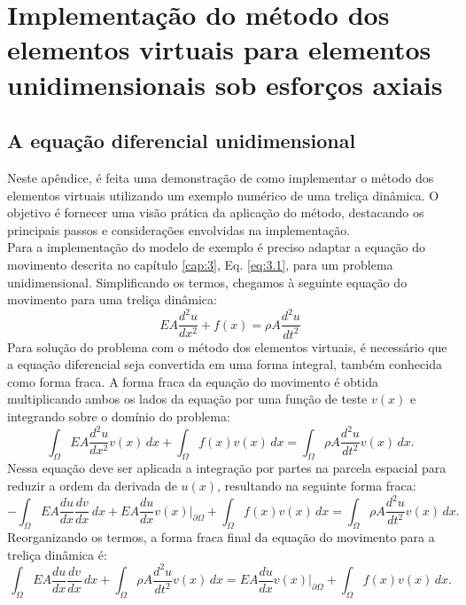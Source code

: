 \chapter{Implementação do método dos elementos virtuais para elementos unidimensionais sob esforços axiais}

\section{A equação diferencial unidimensional}

\indent Neste apêndice, é feita uma demonstração de como implementar o método dos elementos virtuais utilizando um exemplo numérico de uma treliça dinâmica. O objetivo é fornecer uma visão prática da aplicação do método, destacando os principais passos e considerações envolvidas na implementação.\\
\indent Para a implementação do modelo de exemplo é preciso adaptar a equação do movimento descrita no capítulo \ref{cap:3}, Eq. \ref{eq:3.1}, para um problema unidimensional. Simplificando os termos, chegamos à seguinte equação do movimento para uma treliça dinâmica:
\begin{equation} 
    EA\frac{d^2u}{dx^2} + f(x) = \rho A \frac{d^2u}{dt^2} 
\end{equation}
\indent Para solução do problema com o método dos elementos virtuais, é necessário que a equação diferencial seja convertida em uma forma integral, também conhecida como forma fraca. A forma fraca da equação do movimento é obtida multiplicando ambos os lados da equação por uma função de teste $v(x)$ e integrando sobre o domínio do problema:
\begin{equation}
    \int_{\Omega} EA\frac{d^2u}{dx^2} v(x) \, dx + \int_{\Omega} f(x) v(x) \, dx = \int_{\Omega} \rho A \frac{d^2u}{dt^2} v(x) \, dx.
\end{equation}
Nessa equação deve ser aplicada a integração por partes na parcela espacial para reduzir a ordem da derivada de $u(x)$, resultando na seguinte forma fraca:
\begin{equation}
    -\int_{\Omega} EA\frac{du}{dx} \frac{dv}{dx} \, dx + EA\frac{du}{dx} v(x) \Big|_{\partial \Omega} + \int_{\Omega} f(x) v(x) \, dx = \int_{\Omega} \rho A \frac{d^2u}{dt^2} v(x) \, dx.
\end{equation}
Reorganizando os termos, a forma fraca final da equação do movimento para a treliça dinâmica é:
\begin{equation}
    \int_{\Omega} EA\frac{du}{dx} \frac{dv}{dx} \, dx + \int_{\Omega} \rho A \frac{d^2u}{dt^2} v(x) \, dx = EA\frac{du}{dx} v(x) \Big|_{\partial \Omega} +\int_{\Omega} f(x) v(x) \, dx.
\end{equation}
